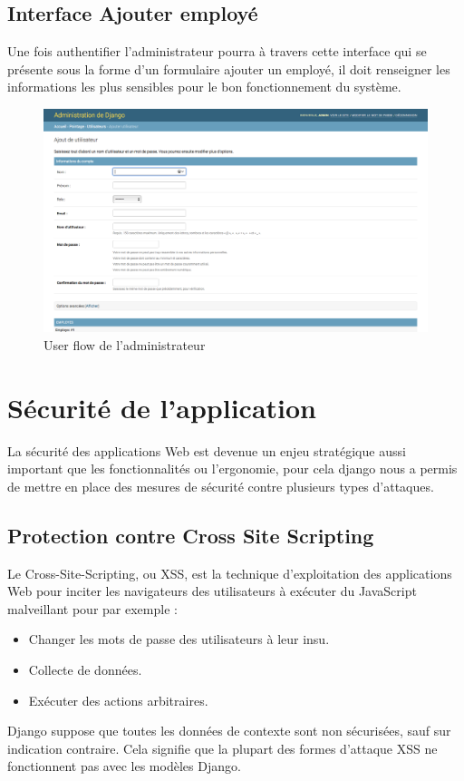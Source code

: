 \subsection*{Interface Ajouter employé}
Une fois authentifier l’administrateur pourra à travers cette interface qui se 
présente sous la forme d’un formulaire ajouter un employé, il doit renseigner 
les informations les plus sensibles pour le bon fonctionnement du système.  
\begin{figure}[h!]
    \centering
    \includegraphics[scale=0.35]{images/interface/admin_add_employe.png}
    \vspace{-20pt}
    \caption{User flow de l'administrateur}
    \label{fig101}
\end{figure}
           
                
\section{Sécurité de l’application}
La sécurité des applications Web est devenue un enjeu stratégique aussi 
important que les fonctionnalités ou l’ergonomie, pour cela django nous a permis 
de mettre en place des mesures de sécurité contre plusieurs types d’attaques.

\subsection{Protection contre Cross Site Scripting}
Le Cross-Site-Scripting, ou XSS, est la technique d'exploitation des 
applications Web pour inciter les navigateurs des utilisateurs à exécuter du 
JavaScript malveillant pour par exemple :

    \begin{itemize}
        \item[\textbullet] Changer les mots de passe des utilisateurs à leur insu.
        \item[\textbullet] Collecte de données.
        \item[\textbullet] Exécuter des actions arbitraires.
    \end{itemize}
Django suppose que toutes les données de contexte sont non sécurisées, sauf sur 
indication contraire. Cela signifie que la plupart des formes d'attaque XSS ne 
fonctionnent pas avec les modèles Django.
            
